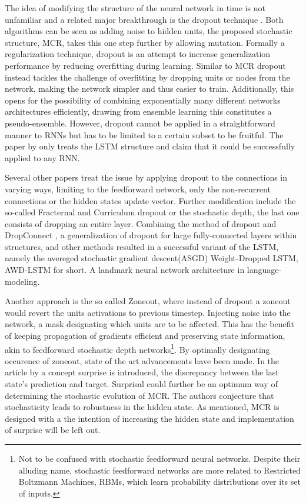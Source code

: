 The idea of modifying the structure of the neural network in time is not unfamiliar and a related major breakthrough is the dropout technique \cite{drop}. Both algorithms can be seen as adding noise to hidden units, the proposed stochastic structure, MCR, takes this one step further by allowing mutation. Formally a regularization technique, dropout is an attempt to increase generalization performance by reducing overfitting during learning. Similar to MCR dropout instead tackles the challenge of overfitting by dropping units or nodes from the network, making the network simpler and thus easier to train. Additionally, this opens for the possibility of combining exponentially many different networks architectures efficiently, drawing from ensemble learning this constitutes a pseudo-ensemble. However, dropout cannot be applied in a straightforward manner to RNNs \cite{dropno} but has to be limited to a certain subset\cite{droprnn} to be fruitful. The paper by \textcite{droprnn} only treats the LSTM structure and claim that it could be successfully applied to any RNN. 

Several other papers treat the issue by applying dropout to the connections in varying ways, limiting to the feedforward network, only the non-recurrent connections or the hidden states update vector. Further modification include the so-called Fracternal and Curriculum dropout or the stochastic depth, the last one consists of dropping an entire layer\cite{stochdep}. Combining the method of dropout and DropConnect \cite{DropConnect}, a generalization of dropout for large fully-connected layers within structures, and other methods resulted in a successful variant of the LSTM, namely the avereged stochastic gradient descent(ASGD) Weight-Dropped LSTM, AWD-LSTM for short. A landmark neural network architecture in language-modeling. 

Another approach is the so called Zoneout\cite{zoneo}, where instead of dropout a zoneout would revert the units activations to previous timestep. Injecting noise into the network, a mask designating which units are to be affected. This has the benefit of keeping propagation of gradients efficient and preserving state information, akin to feedforward stochastic depth networks\footnote{Not to be confused with stochastic feedforward neural networks. Despite their alluding name, stochastic feedforward networks are more related to Restricted Boltzmann Machines, RBMs, which learn probability distributions over its set of inputs.}. By optimally designating occurence of zoneout, state of the art advancements have been made\cite{Zoneout}. In the article by \textcite{Zoneout} a concept surprise is introduced, the discrepancy between the last state's prediction and target. Surprisal could further be an optimum way of determining the stochastic evolution of MCR. The authors \textcite{Zoneout} conjecture that stochasticity leads to robustness in the hidden state. As mentioned, MCR is designed with a the intention of increasing the hidden state and implementation of surprise will be left out.

